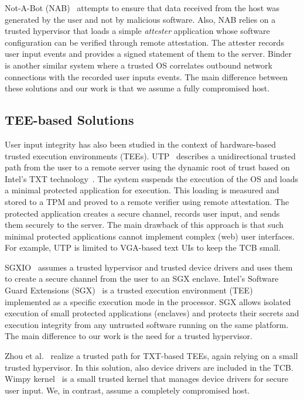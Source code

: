 Not-A-Bot (NAB)~\cite{nab} attempts to ensure that data received from the host was generated by the user and not by malicious software. Also, NAB relies on a trusted hypervisor that loads a simple \emph{attester} application whose software configuration can be verified through remote attestation. The attester records user input events and provides a signed statement of them to the server. Binder~\cite{binder} is another similar system where a trusted OS correlates outbound network connections with the recorded user inputs events. The main difference between these solutions and our work is that we assume a fully compromised host.


\subsection{TEE-based Solutions} 

User input integrity has also been studied in the context of hardware-based trusted execution environments (TEEs).  UTP~\cite{utp} describes a unidirectional trusted path from the user to a remote server using the dynamic root of trust based on Intel's TXT technology~\cite{mccune2008flicker}. The system suspends the execution of the OS and loads a minimal protected application for execution. This loading is measured and stored to a TPM and proved to a remote verifier using remote attestation. The protected application creates a secure channel, records user input, and sends them securely to the server. The main drawback of this approach is that such minimal protected applications cannot implement complex (web) user interfaces. For example, UTP is limited to VGA-based text UIs to keep the TCB small.

SGXIO~\cite{sgxio} assumes a trusted hypervisor and trusted device drivers and uses them to create a secure channel from the user to an SGX enclave. Intel's Software Guard Extensions (SGX)~\cite{sgx} is a trusted execution environment (TEE) implemented as a specific execution mode in the processor. SGX allows isolated execution of small protected applications (enclaves) and protects their secrets and execution integrity from any untrusted software running on the same platform. The main difference to our work is the need for a trusted hypervisor.

Zhou et al.~\cite{x86} realize a trusted path for TXT-based TEEs, again relying on a small trusted hypervisor. In this solution, also device drivers are included in the TCB. Wimpy kernel~\cite{wimpyKernel} is a small trusted kernel that manages device drivers for secure user input. We, in contrast, assume a completely compromised host.


